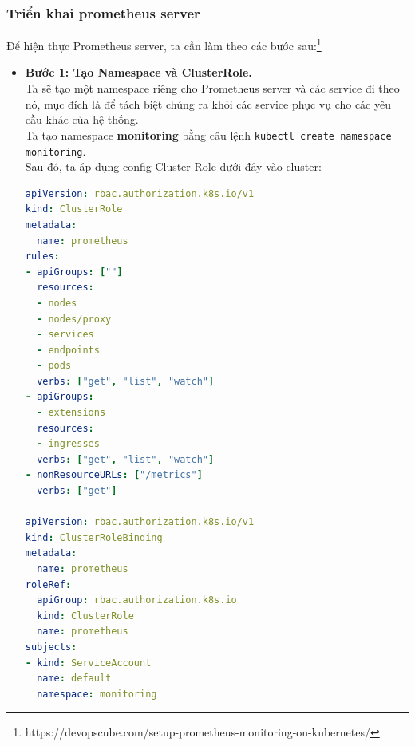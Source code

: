 \subsubsection{Triển khai prometheus server}
\noindent Để hiện thực Prometheus server, ta cần làm theo các bước sau:\footnote{https://devopscube.com/setup-prometheus-monitoring-on-kubernetes/}
\begin{itemize}
  \item \textbf{Bước 1: Tạo Namespace và ClusterRole.}\\[0.2cm]
  Ta sẽ tạo một namespace riêng cho Prometheus server và các service đi theo nó, mục đích là để tách biệt chúng ra khỏi các service phục vụ cho các yêu cầu khác của hệ thống.\\[0.2cm]
  Ta tạo namespace \textbf{monitoring} bằng câu lệnh \lstinline|kubectl create namespace monitoring|.\\[0.2cm]
  Sau đó, ta áp dụng config Cluster Role dưới đây vào cluster:
  \begin{lstlisting}[language=yaml]
apiVersion: rbac.authorization.k8s.io/v1
kind: ClusterRole
metadata:
  name: prometheus
rules:
- apiGroups: [""]
  resources:
  - nodes
  - nodes/proxy
  - services
  - endpoints
  - pods
  verbs: ["get", "list", "watch"]
- apiGroups:
  - extensions
  resources:
  - ingresses
  verbs: ["get", "list", "watch"]
- nonResourceURLs: ["/metrics"]
  verbs: ["get"]
---
apiVersion: rbac.authorization.k8s.io/v1
kind: ClusterRoleBinding
metadata:
  name: prometheus
roleRef:
  apiGroup: rbac.authorization.k8s.io
  kind: ClusterRole
  name: prometheus
subjects:
- kind: ServiceAccount
  name: default
  namespace: monitoring


\end{lstlisting}
\end{itemize}
